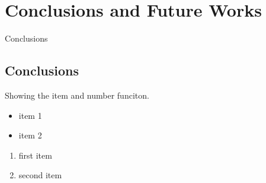 
\chapter{Conclusions and Future Works}\label{chap:CFW}

  Conclusions

  \section{Conclusions}\label{sec:Conclusion}

    Showing the item and number funciton.
    \begin{itemize}
      \item item 1
      \item item 2
    \end{itemize}

    \begin{enumerate}
      \item first item
      \item second item
    \end{enumerate}